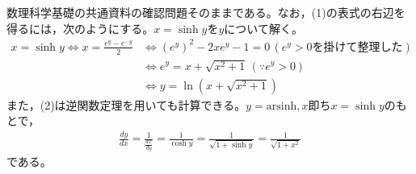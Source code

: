 \documentclass[a4paper,12pt,dvipdfmx,fleqn, oneside]{jsarticle}
\theoremstyle{defstyle}
\theoremstyle{thmx}
\theoremstyle{qesstyle}
\begin{document}
数理科学基礎の共通資料の確認問題そのままである。なお，(1)の表式の右辺を得るには，次のようにする。$x = \sinh y$を$y$について解く。
\begin{align*}
    x = \sinh y \Leftrightarrow x = \frac{e^y - e^{-y}}{2} & \Leftrightarrow (e^y)^2 - 2 x e^y -1 = 0 \, (e^y > 0\text{を掛けて整理した}) \\& \Leftrightarrow e^y = x + \sqrt{x^2 + 1} \, (\because e^y >0) \\ & \Leftrightarrow y = \ln (x+ \sqrt{x^2 + 1})
\end{align*}
また，(2)は逆関数定理を用いても計算できる。$ y = \text{arsinh}, x $即ち$x = \sinh y$のもとで，
\begin{align*}
    \frac{dy}{dx} = \frac{1}{\frac{dx}{dy}}= \frac{1}{\cosh y} = \frac{1}{\sqrt{1 + \sinh y }}= \frac{1}{\sqrt{1+x^2}}
\end{align*}
である。
\end{document}
